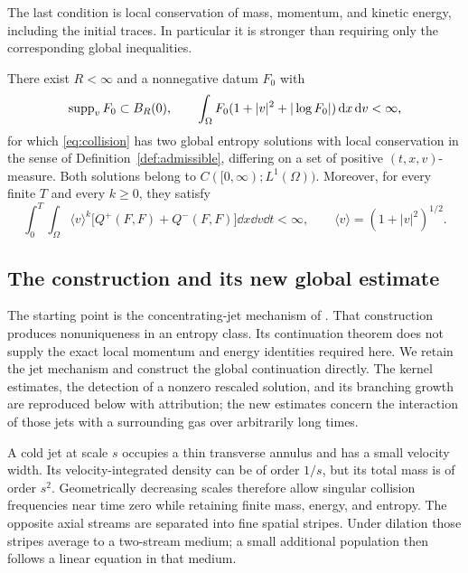 The last condition is local conservation of mass, momentum, and kinetic
energy, including the initial traces. In particular it is stronger than
requiring only the corresponding global inequalities.

\begin{theorem}\label{thm:main}
There exist \(R<\infty\) and a nonnegative datum \(F_0\) with
\[
 \operatorname{supp}_vF_0\subset B_R(0),\qquad
 \int_\Omega F_0(1+|v|^2+|\log F_0|)\,\mathrm d x\,\mathrm d v<\infty,
\]
for which \eqref{eq:collision} has two global entropy solutions with local
conservation in the sense of Definition~\ref{def:admissible}, differing on
a set of positive \((t,x,v)\)-measure. Both solutions belong to
\(C([0,\infty);L^1(\Omega))\). Moreover, for every finite \(T\) and
every \(k\ge0\), they satisfy
\begin{equation}\label{eq:strong-collision-integrability}
 \int_0^T\!\!\int_\Omega
 \langle v\rangle^k\bigl[Q^+(F,F)+Q^-(F,F)\bigr]
                       \dd x\dd v\dd t<\infty,
 \qquad \langle v\rangle=(1+|v|^2)^{1/2}.
\end{equation}
\end{theorem}

\subsection{The construction and its new global estimate}

The starting point is the concentrating-jet mechanism of
\cite{OpenAIPeriodic}. That construction produces nonuniqueness in an
entropy class. Its continuation theorem does not supply the exact local
momentum and energy identities required here. We retain the jet mechanism
and construct the global continuation directly. The kernel estimates,
the detection of a nonzero rescaled solution, and its branching growth
are reproduced below with attribution; the new estimates concern the
interaction of those jets with a surrounding gas over arbitrarily long
times.

A cold jet at scale \(s\) occupies a thin transverse annulus and has a
small velocity width. Its velocity-integrated density can be of order \(1/s\), but its total
mass is of order \(s^2\). Geometrically decreasing scales therefore allow
singular collision frequencies near time zero while retaining finite
mass, energy, and entropy. The opposite axial streams are separated into
fine spatial stripes. Under dilation those stripes average to a
two-stream medium; a small additional population then follows a linear
equation in that medium.

